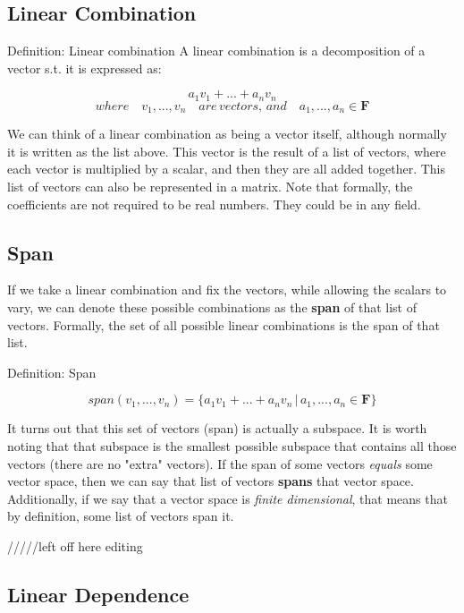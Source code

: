 \documentclass{book}
\begin{document}
\subsection{Linear Combination}

Definition: Linear combination
A linear combination is a decomposition of a vector s.t. it is expressed as:

$$a_1v_1 + ... + a_nv_n$$ 
$$where \quad v_1, ... ,v_n \quad are \, vectors, \, and \quad a_1, ... ,a_n \in \pmb{F}$$

We can think of a linear combination as being a vector itself, although normally it is written as the list above. This vector is the result of a list of vectors, where each vector is multiplied by a scalar, and then they are all added together. This list of vectors can also be represented in a matrix. Note that formally, the coefficients are not required to be real numbers. They could be in any field.

\subsection{Span}

If we take a linear combination and fix the vectors, while allowing the scalars to vary, we can denote these possible combinations as the \textbf{span} of that list of vectors. Formally, the set of all possible linear combinations is the span of that list.

Definition: Span

$$span(v_1,...,v_n)=\{a_1v_1 + ... + a_nv_n \,|\, a_1,...,a_n \in \pmb{F} \}$$

    It turns out that this set of vectors (span) is actually a subspace. It is worth noting that that subspace is the smallest possible subspace that contains all those vectors (there are no "extra" vectors). If the span of some vectors \textit{equals} some vector space, then we can say that list of vectors \textbf{spans} that vector space. Additionally, if we say that a vector space is \textit{finite dimensional}, that means that by definition, some list of vectors span it.
  
  /////left off here editing
\subsection{Linear Dependence}
\end{document}
